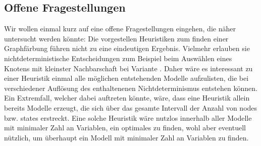 \documentclass[a4paper]{article}
\theoremstyle{nonumberplain}
\begin{document}
\begin{figure}
\begin{center}
{{
			}
		}
	\end{center}
	\begin{center}
	\end{center}
\end{figure}


\subsection{Offene Fragestellungen}

Wir wollen einmal kurz auf eine offene Fragestellungen eingehen, die näher untersucht werden könnte:
Die vorgestellen Heuristiken zum finden einer Graphfärbung führen nicht zu eine eindeutigen Ergebnis.
Vielmehr erlauben sie nichtdeterministische Entscheidungen zum Beispiel beim Auswählen eines Knotens mit kleinster Nachbarschaft bei Variante .
Daher wäre es interessant zu einer Heuristik einmal alle möglichen entstehenden Modelle aufzulisten, die bei verschiedener Auflösung des enthaltenenen Nichtdeterminismus entstehen können.
Ein Extremfall, welcher dabei auftreten könnte, wäre, dass eine Heuristik allein bereits Modelle erzeugt, die sich über das gesamte Intervall der Anzahl von nodes bzw. states erstreckt.
Eine solche Heuristik wäre nutzlos innerhalb aller Modelle mit minimaler Zahl an Variablen, ein optimales zu finden, wohl aber eventuell nützlich, um überhaupt ein Modell mit minimaler Zahl an Variablen zu finden.


\printbibliography
\end{document}
